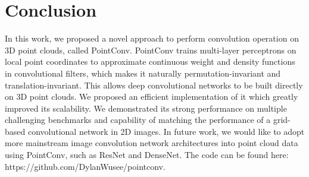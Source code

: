 \documentclass[10pt,twocolumn,letterpaper]{article}
\begin{document}
\section{Conclusion}

In this work, we proposed a novel approach to perform convolution operation on 3D point clouds, called PointConv. PointConv trains multi-layer perceptrons on local point coordinates to approximate continuous weight and density functions in convolutional filters, which makes it naturally permutation-invariant and translation-invariant. This allows deep convolutional networks to be built directly on 3D point clouds. We proposed an efficient implementation of it which greatly improved its scalability. We demonstrated its strong performance on multiple challenging benchmarks and capability of matching the performance of a grid-based convolutional network in 2D images. In future work, we would like to adopt more mainstream image convolution network architectures into point cloud data using PointConv, such as ResNet and DenseNet. The code can be found here: https://github.com/DylanWusee/pointconv.

\nocite{chang2015shapenet,dai2017scannet,jacobsen2016structured,noh2015learning,qi2016volumetric,qi2017frustum}
\nocite{qi2017pointnet,qi2017pointnet++,ravanbakhsh2016deep,su2015multi,yi2017syncspeccnn,zhou2017voxelnet}
\nocite{bronstein2010scale,chen2003visual,fang20153d,gressin2013towards,guo20153d,he2016deep,kingma2014adam}
\nocite{krizhevsky2012imagenet,ling2007shape,maturana2015voxnet,rusu2009fast,simonyan2014very,wu2014interactive}
\nocite{wu20153d, huang2018recurrent, qi20173d, zhou2017unsupervised, chu2018surfconv}

{\small


}
\end{document}
